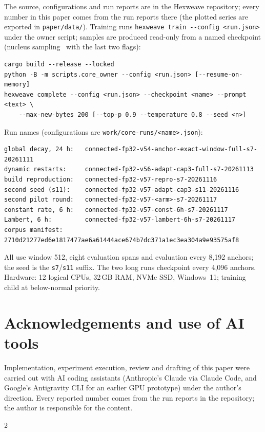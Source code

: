 \documentclass[10pt]{article}
\newcommand{\code}[1]{\texttt{#1}}
\begin{document}
The source, configurations and run reports are in the Hexweave repository; every number in this paper
comes from the run reports there (the plotted series are exported in \code{paper/data/}). Training
runs \code{hexweave train -{}-config <run.json>} under the owner script; samples are produced
read-only from a named checkpoint (nucleus sampling~\citep{holtzman2019curious} with the last two flags):
\begin{small}
\begin{verbatim}
cargo build --release --locked
python -B -m scripts.core_owner --config <run.json> [--resume-on-memory]
hexweave complete --config <run.json> --checkpoint <name> --prompt <text> \
    --max-new-bytes 200 [--top-p 0.9 --temperature 0.8 --seed <n>]
\end{verbatim}
\end{small}
Run names (configurations are \code{work/core-runs/<name>.json}):
\begin{footnotesize}
\begin{verbatim}
global decay, 24 h:   connected-fp32-v54-anchor-exact-window-full-s7-20261111
dynamic restarts:     connected-fp32-v56-adapt-cap3-full-s7-20261113
build reproduction:   connected-fp32-v57-repro-s7-20261116
second seed (s11):    connected-fp32-v57-adapt-cap3-s11-20261116
second pilot round:   connected-fp32-v57-<arm>-s7-20261117
constant rate, 6 h:   connected-fp32-v57-const-6h-s7-20261117
Lambert, 6 h:         connected-fp32-v57-lambert-6h-s7-20261117
corpus manifest:      2710d21277ed6e1817477ae6a61444ace674b7dc371a1ec3ea304a9e93575af8
\end{verbatim}
\end{footnotesize}
All use window 512, eight evaluation spans and evaluation every 8,192 anchors; the seed is the
\code{s7}/\code{s11} suffix. The two long runs checkpoint every 4,096 anchors. Hardware: 12 logical CPUs, 32\,GB RAM, NVMe SSD, Windows~11; training child at
below-normal priority.

\section*{Acknowledgements and use of AI tools}
Implementation, experiment execution, review and drafting of this paper were carried out with AI coding
assistants (Anthropic's Claude via Claude Code, and Google's Antigravity CLI for an earlier GPU
prototype) under the author's direction. Every reported number comes from the run reports in the
repository; the author is responsible for the content.


\begin{multicols}{2}

\end{multicols}
\end{document}
